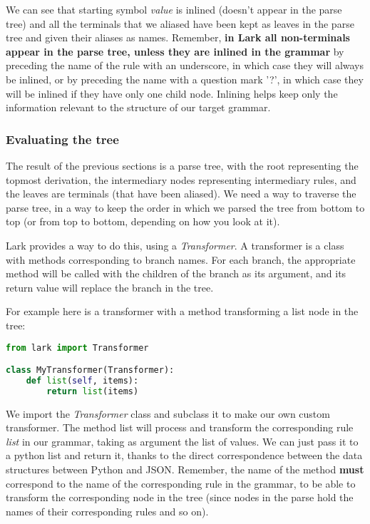 \documentclass[12pt]{article}
\begin{document}
We can see that starting symbol \emph{value} is inlined (doesn't appear in the parse tree) and all the terminals that we aliased have been kept as leaves in the parse tree and given their aliases as names. Remember, \textbf{in Lark all non-terminals appear in the parse tree, unless they are inlined in the grammar} by preceding the name of the rule with an underscore, in which case they will always be inlined, or by preceding the name with a question mark '?', in which case they will be inlined if they have only one child node. Inlining helps keep only the information relevant to the structure of our target grammar.

\subsubsection{Evaluating the tree}
The result of the previous sections is a parse tree, with the root representing the topmost derivation, the intermediary nodes representing intermediary rules, and the leaves are terminals (that have been aliased). We need a way to traverse the parse tree, in a way to keep the order in which we parsed the tree from bottom to top (or from top to bottom, depending on how you look at it).

Lark provides a way to do this, using a \emph{Transformer}. A transformer is a class with methods corresponding to branch names. For each branch, the appropriate method will be called with the children of the branch as its argument, and its return value will replace the branch in the tree.

For example here is a transformer with a method transforming a list node in the tree:
\begin{lstlisting}[language=Python]
from lark import Transformer

class MyTransformer(Transformer):
    def list(self, items):
        return list(items)

\end{lstlisting}

We import the \emph{Transformer} class and subclass it to make our own custom transformer. The method list will process and transform the corresponding rule \emph{list} in our grammar, taking as argument the list of values. We can just pass it to a python list and return it, thanks to the direct correspondence between the data structures between Python and JSON. Remember, the name of the method \textbf{must} correspond to the name of the corresponding rule in the grammar, to be able to transform the corresponding node in the tree (since nodes in the parse hold the names of their corresponding rules and so on).
\end{document}
